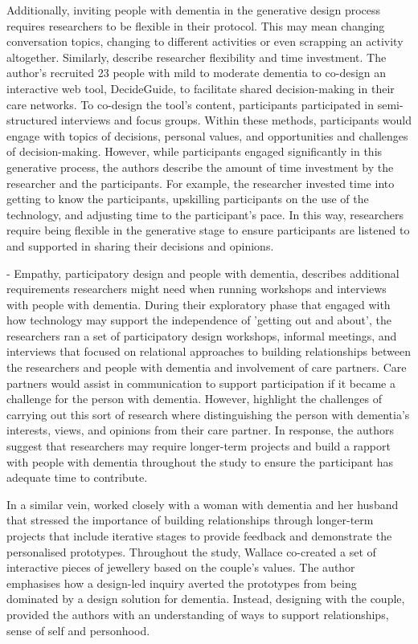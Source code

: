 Additionally, inviting people with dementia in the generative design process requires researchers to be flexible in their protocol. This may mean changing conversation topics, changing to different activities or even scrapping an activity altogether. Similarly, \cite{span2015interactive} describe researcher flexibility and time investment. The author's recruited 23 people with mild to moderate dementia to co-design an interactive web tool, DecideGuide, to facilitate shared decision-making in their care networks. To co-design the tool's content, participants participated in semi-structured interviews and focus groups. Within these methods, participants would engage with topics of decisions, personal values, and opportunities and challenges of decision-making. However, while participants engaged significantly in this generative process, the authors describe the amount of time investment by the researcher and the participants. For example, the researcher invested time into getting to know the participants, upskilling participants on the use of the technology, and adjusting time to the participant's pace. In this way, researchers require being flexible in the generative stage to ensure participants are listened to and supported in sharing their decisions and opinions.

\cite{lindsay_empathy_2012} - Empathy, participatory design and people with dementia, describes additional requirements researchers might need when running workshops and interviews with people with dementia. During their exploratory phase that engaged with how technology may support the independence of 'getting out and about', the researchers ran a set of participatory design workshops, informal meetings, and interviews that focused on relational approaches to building relationships between the researchers and people with dementia and involvement of care partners. Care partners would assist in communication to support participation if it became a challenge for the person with dementia. However, \cite{lindsay_empathy_2012} highlight the challenges of carrying out this sort of research where distinguishing the person with dementia's interests, views, and opinions from their care partner. In response, the authors suggest that researchers may require longer-term projects and build a rapport with people with dementia throughout the study to ensure the participant has adequate time to contribute.

In a similar vein, \cite{wallace_design-led_2013} worked closely with a woman with dementia and her husband that stressed the importance of building relationships through longer-term projects that include iterative stages to provide feedback and demonstrate the personalised prototypes. Throughout the study, Wallace co-created a set of interactive pieces of jewellery based on the couple's values. The author emphasises how a design-led inquiry averted the prototypes from being dominated by a design solution for dementia. Instead, designing with the couple, provided the authors with an understanding of ways to support relationships, sense of self and personhood.


